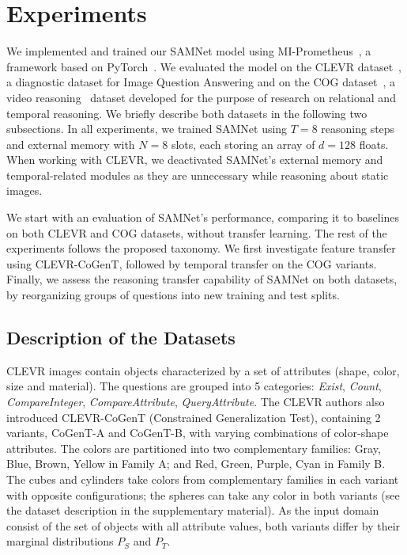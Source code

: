 \section{Experiments}
\label{sec:experiments}

We implemented and trained our SAMNet model using MI-Prometheus~\cite{kornuta2018accelerating}, a framework based on PyTorch~\cite{paszke2017automatic}.
We evaluated the model on
the CLEVR dataset~\cite{johnson2017clevr}, a diagnostic dataset for Image Question Answering and on the COG dataset~\cite{yang2018dataset}, a video reasoning~\cite{mogadala2019trends} dataset developed for the purpose of research on relational and temporal reasoning.
We briefly describe both datasets in the following two subsections.
In all experiments, we trained SAMNet using $T = 8$ reasoning steps and external memory with $N = 8$ slots, each storing an array of $d = 128$ floats.
When working with CLEVR, we deactivated SAMNet's external memory and temporal-related modules as they are unnecessary while reasoning about static images.

We start with an evaluation of SAMNet's performance, comparing it to baselines on both CLEVR and COG datasets, without transfer learning.
The rest of the experiments follows the proposed taxonomy.
We first investigate feature transfer using CLEVR-CoGenT, followed by temporal transfer on the COG variants. Finally, we assess the reasoning transfer capability of SAMNet on both datasets, by reorganizing groups of questions into new training and test splits.


\subsection{Description of the Datasets}
\label{sec:datasets-desc}

CLEVR images contain objects characterized by a set of attributes (shape, color, size and material). The questions are grouped into 5 categories: \textit{Exist}, \textit{Count}, \textit{CompareInteger}, \textit{CompareAttribute}, \textit{QueryAttribute}.
The CLEVR authors also introduced CLEVR-CoGenT (Constrained Generalization Test), containing 2 variants, CoGenT-A and CoGenT-B, with varying combinations of color-shape attributes.
The colors are partitioned into two complementary families:
Gray, Blue, Brown, Yellow in Family A; and Red, Green, Purple, Cyan in Family B.
The cubes and cylinders take colors from complementary families in each variant with opposite configurations; the spheres can take any color in both variants (see the dataset description in the supplementary material).
As the input domain consist of the set of objects with all attribute values, both variants differ by their marginal distributions $P_S$ and $P_T$.

